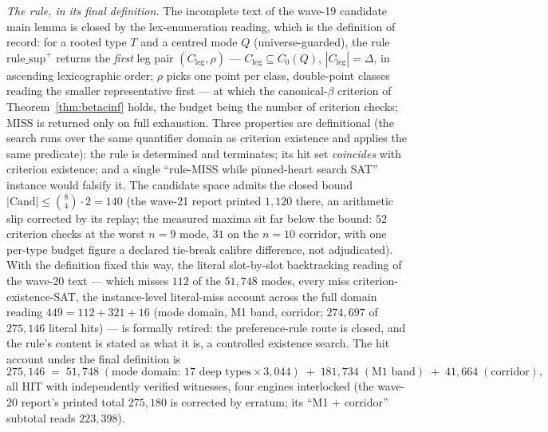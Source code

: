 \emph{The rule, in its final definition.} The incomplete text of the wave-19 candidate
main lemma is closed by the lex-enumeration reading, which is the definition of record:
for a rooted type $T$ and a centred mode $Q$ (universe-guarded), the rule
$\mathrm{rule\_sup}^{+}$ returns the \emph{first} leg pair $(C_{\mathrm{leg}},\rho)$
--- $C_{\mathrm{leg}}\subseteq C_0(Q)$, $|C_{\mathrm{leg}}|=\Delta$, in ascending
lexicographic order; $\rho$ picks one point per class, double-point classes reading the
smaller representative first --- at which the canonical-$\beta$ criterion of
Theorem~\ref{thm:betacinf} holds, the budget being the number of criterion checks; MISS
is returned only on full exhaustion. Three properties are definitional (the search runs
over the same quantifier domain as criterion existence and applies the same predicate):
the rule is determined and terminates; its hit set \emph{coincides} with criterion
existence; and a single ``rule-MISS while pinned-heart search SAT'' instance would
falsify it. The candidate space admits the closed bound
$|\mathrm{Cand}|\le\binom{8}{4}\cdot 2=140$ (the wave-21 report printed $1{,}120$ there,
an arithmetic slip corrected by its replay; the measured maxima sit far below the bound:
$52$ criterion checks at the worst $n{=}9$ mode, $31$ on the $n{=}10$ corridor, with one
per-type budget figure a declared tie-break calibre difference, not adjudicated). With
the definition fixed this way, the literal slot-by-slot backtracking reading of the
wave-20 text --- which misses $112$ of the $51{,}748$ modes, every miss
criterion-existence-SAT, the instance-level literal-miss account across the full domain
reading $449=112+321+16$ (mode domain, M1 band, corridor; $274{,}697$ of $275{,}146$
literal hits) --- is formally retired: the preference-rule route is closed,
and the rule's content is stated as what it is, a controlled existence search. The hit
account under the final definition is
\[
275{,}146 \;=\; 51{,}748\;(\text{mode domain: }17\text{ deep types}\times 3{,}044)
\;+\; 181{,}734\;(\text{M1 band})
\;+\; 41{,}664\;(\text{corridor}),
\]
all HIT with independently verified witnesses, four engines interlocked (the wave-20
report's printed total $275{,}180$ is corrected by erratum; its ``M1 $+$ corridor''
subtotal reads $223{,}398$).

